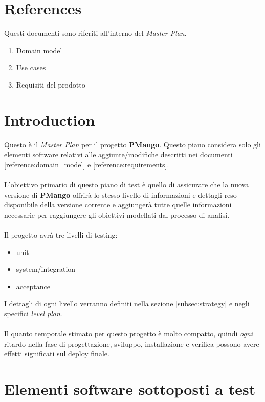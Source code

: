 \section{References}
Questi documenti sono riferiti all'interno del \emph{Master Plan}.
\begin{enumerate}
  \item Domain model \label{reference:domain_model}
  \item Use cases \label{reference:use_cases}
  \item Requisiti del prodotto  \label{reference:requirements}
\end{enumerate}

\section{Introduction}

Questo \`e il \emph{Master Plan} per il progetto \textbf{PMango}. Questo piano
considera solo gli elementi software relativi alle aggiunte/modifiche descritti
nei documenti \ref{reference:domain_model} e \ref{reference:requirements}.
\\ \\
L'obiettivo primario di questo piano di test \`e quello di assicurare che la
nuova versione di \textbf{PMango} offrir\`a lo stesso livello di informazioni e
dettagli reso disponibile della versione corrente e aggiunger\`a tutte quelle
informazioni necessarie per raggiungere gli obiettivi modellati dal processo di
analisi.
\\ \\
Il progetto avr\`a tre livelli di testing: 
\begin{itemize}
  \item unit
  \item system/integration
  \item acceptance
\end{itemize}
I dettagli di ogni livello verranno definiti nella sezione \ref{subsec:strategy}
e negli specifici \emph{level plan}. \\ \\
Il quanto temporale stimato per questo progetto \`e molto compatto, quindi
\emph{ogni} ritardo nella fase di progettazione, sviluppo, installazione e
verifica possono avere effetti significati sul deploy finale.

\section{Elementi software sottoposti a test}

